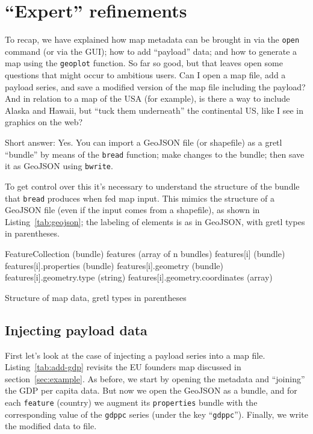 \documentclass{article}
\begin{document}
\section{``Expert'' refinements}
\label{sec:expert}

To recap, we have explained how map metadata can be brought in via the
\texttt{open} command (or via the GUI); how to add ``payload'' data;
and how to generate a map using the \texttt{geoplot} function. So far
so good, but that leaves open some questions that might occur to
ambitious users.  Can I open a map file, add a payload series, and
save a modified version of the map file including the payload? And in
relation to a map of the USA (for example), is there a way to include
Alaska and Hawaii, but ``tuck them underneath'' the continental US,
like I see in graphics on the web?

Short answer: Yes. You can import a GeoJSON file (or shapefile) as a
gretl ``bundle'' by means of the \texttt{bread} function; make changes
to the bundle; then save it as GeoJSON using \texttt{bwrite}.

To get control over this it's necessary to understand the structure of
the bundle that \texttt{bread} produces when fed map input. This
mimics the structure of a GeoJSON file (even if the input comes from a
shapefile), as shown in Listing~\ref{tab:geojson}; the labeling of
elements is as in GeoJSON, with gretl types in parentheses.

\begin{script}[htbp]
\begin{scode}
FeatureCollection (bundle)
  features (array of n bundles)
    features[i] (bundle)
      features[i].properties (bundle)
      features[i].geometry   (bundle)
        features[i].geometry.type (string)
        features[i].geometry.coordinates (array)
\end{scode}
  \caption{Structure of map data, gretl types in parentheses}
  \label{tab:geojson}
\end{script}

\subsection{Injecting payload data}
\label{sec:inject}

First let's look at the case of injecting a payload series into a map
file. Listing~\ref{tab:add-gdp} revisits the EU founders map discussed
in section~\ref{sec:example}.  As before, we start by opening the
metadata and ``joining'' the GDP per capita data. But now we open the
GeoJSON as a bundle, and for each \texttt{feature} (country) we
augment its \texttt{properties} bundle with the corresponding value of
the \texttt{gdppc} series (under the key ``\texttt{gdppc}''). Finally,
we write the modified data to file.
\end{document}
